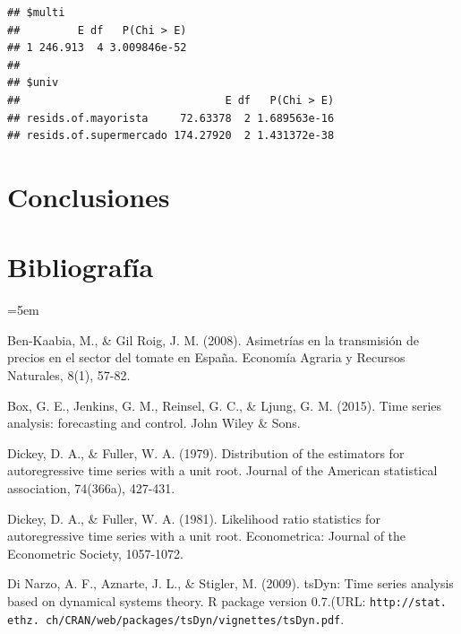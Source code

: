 \documentclass[12pt, twoside]{book}\usepackage[]{graphicx}\usepackage[]{color}
\makeatletter
\newenvironment{kframe}{%
 \def\at@end@of@kframe{}%
 \ifinner\ifhmode%
  \def\at@end@of@kframe{\end{minipage}}%
  \begin{minipage}{\columnwidth}%
 \fi\fi%
 \def\FrameCommand##1{\hskip\@totalleftmargin \hskip-\fboxsep
 \colorbox{shadecolor}{##1}\hskip-\fboxsep
     \hskip-\linewidth \hskip-\@totalleftmargin \hskip\columnwidth}%
 \MakeFramed {\advance\hsize-\width
   \@totalleftmargin\z@ \linewidth\hsize
   \@setminipage}}%
 {\par\unskip\endMakeFramed%
 \at@end@of@kframe}
\newenvironment{knitrout}{}{} %
\numberwithin{equation}{section}
\numberwithin{theorem}{section}
\numberwithin{teorema}{section}
\numberwithin{defi}{section}
\numberwithin{prop}{section}
\numberwithin{defi}{section}
\theoremstyle{plain}
\makeatother
\begin{document}
\begin{knitrout}
\color{fgcolor}\begin{kframe}


{\ttfamily\noindent\bfseries\color{errorcolor}{\#\# Error in residuals(mono\_rest): objeto 'mono\_rest' no encontrado}}\begin{verbatim}
## $multi
##         E df   P(Chi > E)
## 1 246.913  4 3.009846e-52
## 
## $univ
##                                E df   P(Chi > E)
## resids.of.mayorista     72.63378  2 1.689563e-16
## resids.of.supermercado 174.27920  2 1.431372e-38
\end{verbatim}


{\ttfamily\noindent\bfseries\color{errorcolor}{\#\# Error in residuals(mono\_rest): objeto 'mono\_rest' no encontrado}}

{\ttfamily\noindent\bfseries\color{errorcolor}{\#\# Error in residuals(mono\_rest): objeto 'mono\_rest' no encontrado}}\end{kframe}
\end{knitrout}


\chapter{Conclusiones}
\chapter{Bibliografía}

\hangindent=5em

Ben-Kaabia, M., \& Gil Roig, J. M. (2008). Asimetrías en la transmisión de precios en el sector del tomate en España. Economía Agraria y Recursos Naturales, 8(1), 57-82.

Box, G. E., Jenkins, G. M., Reinsel, G. C., \& Ljung, G. M. (2015). Time series analysis: forecasting and control. John Wiley \& Sons.

Dickey, D. A., \& Fuller, W. A. (1979). Distribution of the estimators for autoregressive time series with a unit root. Journal of the American statistical association, 74(366a), 427-431.

Dickey, D. A., \& Fuller, W. A. (1981). Likelihood ratio statistics for autoregressive time series with a unit root. Econometrica: Journal of the Econometric Society, 1057-1072.

Di Narzo, A. F., Aznarte, J. L., \& Stigler, M. (2009). tsDyn: Time series analysis based on dynamical systems theory. R package version 0.7.(URL: \texttt{http://stat. ethz. ch/CRAN/web/packages/tsDyn/vignettes/tsDyn.pdf}.
\end{document}
